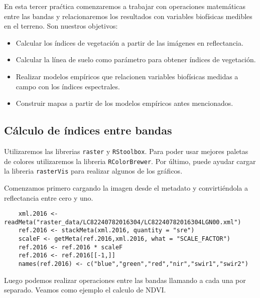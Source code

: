 En esta tercer pra\'ctica comenzaremos a trabajar con operaciones matem\'aticas
entre las bandas y relacionaremos los resultados con variables biof\'isicas medibles en el terreno. Son
nuestros objetivos:

\begin{itemize}
    \item Calcular los \'indices de vegetaci\'on a partir de las im\'agenes en
        reflectancia.
    \item Calcular la l\'inea de suelo como par\'ametro para obtener \'indices
        de vegetaci\'on.
    \item Realizar modelos emp\'iricos que relacionen variables biof\'isicas
        medidas a campo con los \'indices espectrales.
    \item Construir mapas a partir de los modelos emp\'iricos antes mencionados.
\end{itemize}


\subsection{C\'alculo de \'indices entre bandas}
Utilizaremos las librerias \texttt{raster} y \texttt{RStoolbox}. Para
poder usar mejores paletas de colores utilizaremos la libreria
\texttt{RColorBrewer}. Por \'ultimo, puede ayudar cargar la libreria \texttt{rasterVis}
para realizar algunos de los gr\'aficos.

Comenzamos primero cargando la imagen desde el metadato y convirti\'endola a
reflectancia entre cero y uno.

\begin{lstlisting}
    xml.2016 <- readMeta("raster_data/LC82240782016304/LC82240782016304LGN00.xml")
    ref.2016 <- stackMeta(xml.2016, quantity = "sre")
    scaleF <- getMeta(ref.2016,xml.2016, what = "SCALE_FACTOR")
    ref.2016 <- ref.2016 * scaleF
    ref.2016 <- ref.2016[[-1,]]
    names(ref.2016) <- c("blue","green","red","nir","swir1","swir2")
\end{lstlisting}

Luego podemos realizar operaciones entre las bandas llamando
a cada una por separado. Veamos como ejemplo el calculo de NDVI\@.

